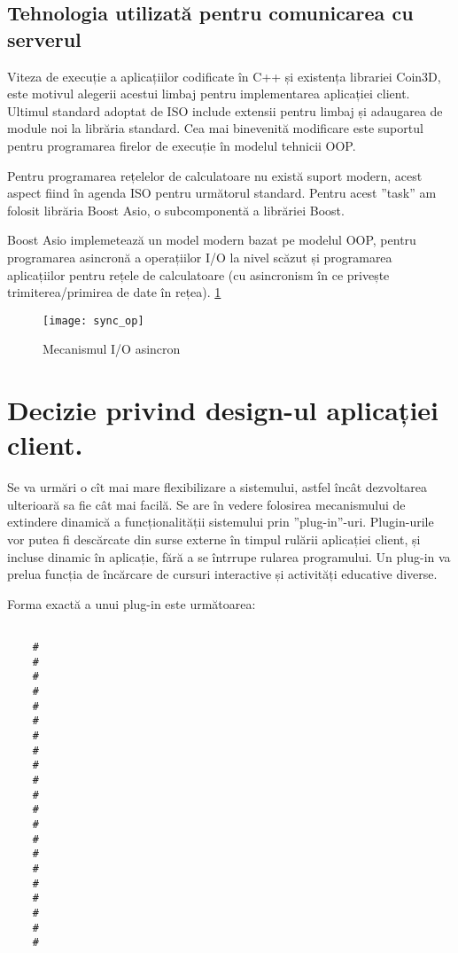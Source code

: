 \subsection{Tehnologia utilizată pentru comunicarea cu serverul}

\par Viteza de execuție a aplicațiilor codificate în C++ și existența librariei Coin3D, este motivul alegerii acestui limbaj pentru implementarea aplicației client. Ultimul standard adoptat de ISO include extensii pentru limbaj și adaugarea de module noi la librăria standard. Cea mai binevenită modificare este suportul pentru programarea firelor de execuție în modelul tehnicii OOP. 
\par Pentru programarea rețelelor de calculatoare nu există suport modern, acest aspect fiind în agenda ISO pentru următorul standard. Pentru acest ”task” am folosit librăria Boost Asio, o subcomponentă a librăriei Boost. 
\par Boost Asio implemetează un model modern bazat pe modelul OOP, pentru programarea asincronă a operațiilor I/O la nivel scăzut și programarea aplicațiilor pentru rețele de calculatoare (cu asincronism în ce privește trimiterea/primirea de date în rețea). \ref{fig:asio}

\begin{figure}[h]
    \centering
    \texttt{[image: sync\_op]}
    \caption{Mecanismul I/O asincron}
    \label{fig:asio}
\end{figure}

\section{Decizie privind design-ul aplicației client.}
\par Se va urmări o cît mai mare flexibilizare a sistemului, astfel încât dezvoltarea ulterioară sa fie cât mai facilă. Se are în vedere folosirea mecanismului de extindere dinamică a funcționalității sistemului prin ”plug-in”-uri. 	Plugin-urile vor putea fi descărcate din surse externe în timpul rulării aplicației client, și incluse dinamic în aplicație, fără a se întrrupe rularea programului. Un plug-in va prelua funcția de încărcare de cursuri interactive și activități educative diverse. 

	Forma exactă a unui plug-in este următoarea:
\begin{verbatim}

	#
	#
	#
	#
	#
	#
	#
	#
	#
	#
	#
	#
	#
	#
	#
	#
	#
    #
    #
    # 
    #

\end{verbatim}	
	
